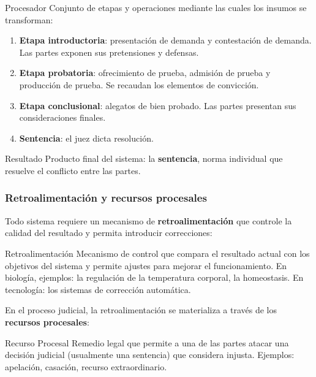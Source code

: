 \documentclass[12pt,oneside]{book}
\begin{document}
\begin{definition}{Procesador}
Conjunto de etapas y operaciones mediante las cuales los insumos se transforman:
\begin{enumerate}
    \item \textbf{Etapa introductoria}: presentación de demanda y contestación de demanda. Las partes exponen sus pretensiones y defensas.
    \item \textbf{Etapa probatoria}: ofrecimiento de prueba, admisión de prueba y producción de prueba. Se recaudan los elementos de convicción.
    \item \textbf{Etapa conclusional}: alegatos de bien probado. Las partes presentan sus consideraciones finales.
    \item \textbf{Sentencia}: el juez dicta resolución.
\end{enumerate}
\end{definition}

\begin{definition}{Resultado}
Producto final del sistema: la \textbf{sentencia}, norma individual que resuelve el conflicto entre las partes.
\end{definition}

\subsubsection{Retroalimentación y recursos procesales}

Todo sistema requiere un mecanismo de \textbf{retroalimentación} que controle la calidad del resultado y permita introducir correcciones:

\begin{definition}{Retroalimentación}
Mecanismo de control que compara el resultado actual con los objetivos del sistema y permite ajustes para mejorar el funcionamiento. En biología, ejemplos: la regulación de la temperatura corporal, la homeostasis. En tecnología: los sistemas de corrección automática.
\end{definition}

En el proceso judicial, la retroalimentación se materializa a través de los \textbf{recursos procesales}:

\begin{definition}{Recurso Procesal}
Remedio legal que permite a una de las partes atacar una decisión judicial (usualmente una sentencia) que considera injusta. Ejemplos: apelación, casación, recurso extraordinario.
\end{definition}
\end{document}
